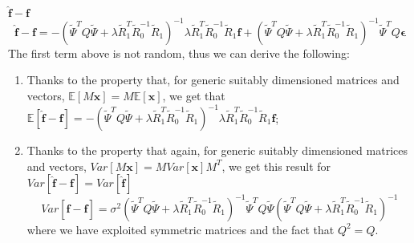 $\hat{\bm{f}} - \bm{f}$
\begin{equation}
	\hat{\bm{f}} - \bm{f} =
	-\left(\tilde{\Psi}^TQ\tilde{\Psi} +\lambda \tilde{R}_1^T \tilde{R}_0^{-1} \tilde{R}_1 \right)^{-1}
	\lambda \tilde{R}_1^T \tilde{R}_0^{-1} \tilde{R}_1 \bm{f} +
	\left(\tilde{\Psi}^TQ\tilde{\Psi} +\lambda \tilde{R}_1^T \tilde{R}_0^{-1} \tilde{R}_1 \right)^{-1}
	\tilde{\Psi}^T Q \bm{\epsilon}
\end{equation}
The first term above is not random, thus we can derive the following:
\begin{enumerate}
	\item Thanks to the property that, for generic suitably dimensioned matrices and vectors, $\mathbb{E}\left[M \bm{x}\right] = M \mathbb{E}\left[\bm{x}\right]$, we get that $\mathbb{E}\left[\hat{\bm{f}} - \bm{f}\right] =
		      -\left(\tilde{\Psi}^TQ\tilde{\Psi} +\lambda \tilde{R}_1^T \tilde{R}_0^{-1} \tilde{R}_1 \right)^{-1}
		      \lambda \tilde{R}_1^T \tilde{R}_0^{-1} \tilde{R}_1 \bm{f}$;
	\item Thanks to the property that again, for generic suitably dimensioned matrices and vectors, $Var  \left[M \bm{x}\right] = M Var\left[\bm{x}\right] M^T$, we get this result for $Var\left[\hat{\bm{f}} - \bm{f}\right] = Var \left[\hat{\bm{f}}\right]$
	      \begin{equation}
		      Var\left[\hat{\bm{f}} - \bm{f}\right] =
		      \sigma^2 \left(\tilde{\Psi}^TQ\tilde{\Psi} +\lambda \tilde{R}_1^T \tilde{R}_0^{-1} \tilde{R}_1 \right)^{-1} \tilde{\Psi}^T Q
		      \tilde{\Psi} \left(\tilde{\Psi}^TQ\tilde{\Psi} +\lambda \tilde{R}_1^T \tilde{R}_0^{-1} \tilde{R}_1 \right)^{-1}
	      \end{equation}
	      where we have exploited symmetric matrices and the fact that $Q^2 =
		      Q$.
\end{enumerate}
